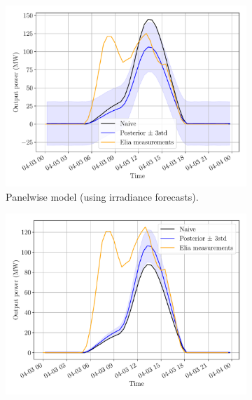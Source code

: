\documentclass[a4paper, 12pt]{article}
\begin{document}
\begin{figure}[H]
	\centering
	\begin{subfigure}{0.48\textwidth}
		\centering
		\includegraphics[width=\textwidth]{resources/pdf/solar_panelwise_meas_for_START_FOR_03-04-2020.pdf}
		\vspace{-0.5em}
		\caption{Panelwise model (using irradiance forecasts).}
	\end{subfigure}
	\hspace{0.5em}
	\begin{subfigure}{0.48\textwidth}
		\centering
		\includegraphics[width=\textwidth]{resources/pdf/solar_provincial_meas_for_START_FOR_03-04-2020.pdf}
		\vspace{-0.5em}

\end{subfigure}
\end{figure}
\end{document}
